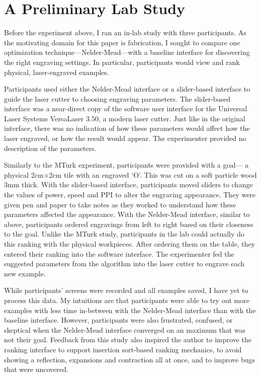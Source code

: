 \section{A Preliminary Lab Study}

Before the experiment above, I ran an in-lab study with three participants.
As the motivating domain for this paper is fabrication, I sought to compare one optimization technique---Nelder-Mead---with a baseline interface for discovering the right engraving settings.
In particular, participants would view and rank physical, laser-engraved examples.

Participants used either the Nelder-Mead interface or a slider-based interface to guide the laser cutter to choosing engraving parameters.
The slider-based interface was a near-direct copy of the software user interface for the Universal Laser Systems VersaLaser 3.50, a modern laser cutter.
Just like in the original interface, there was no indication of how these parameters would affect how the laser engraved, or how the result would appear.
The experimenter provided no description of the parameters.

Similarly to the MTurk experiment, participants were provided with a goal---
a physical 2cm$\times$2cm tile with an engraved `O'.
This was cut on a soft particle wood 3mm thick.
With the slider-based interface, participants moved sliders to change the values of power, speed and PPI to alter the engraving appearance.
They were given pen and paper to take notes as they worked to understand how these parameters affected the appearance.
With the Nelder-Mead interface, similar to above, participants ordered engravings from left to right based on their closeness to the goal.
Unlike the MTurk study, participants in the lab could actually do this ranking with the physical workpieces.
After ordering them on the table, they entered their ranking into the software interface.
The experimenter fed the suggested parameters from the algorithm into the laser cutter to engrave each new example.

While participants' screens were recorded and all examples saved, I have yet to process this data.
My intuitions are that participants were able to try out more examples with less time in-between with the Nelder-Mead interface than with the baseline interface.
However, participants were also frustrated, confused, or skeptical when the Nelder-Mead interface converged on an maximum that was not their goal.
Feedback from this study also inspired the author to improve the ranking interface to support insertion sort-based ranking mechanics, to avoid showing a reflection, expansions and contraction all at once, and to improve bugs that were uncovered.
